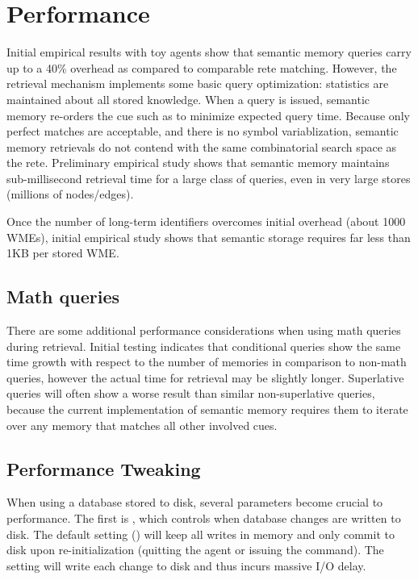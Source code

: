 \section{Performance}
\label{SMEM-perf}

Initial empirical results with toy agents show that semantic memory queries carry up to a 40\% overhead as compared to comparable rete matching.  
However, the retrieval mechanism implements some basic query optimization: statistics are maintained about all stored knowledge.  
When a query is issued, semantic memory re-orders the cue such as to minimize expected query time.  
Because only perfect matches are acceptable, and there is no symbol variablization, semantic memory retrievals do not contend with the same combinatorial search space as the rete.  
Preliminary empirical study shows that semantic memory maintains sub-millisecond retrieval time for a large class of queries, even in very large stores (millions of nodes/edges).

Once the number of long-term identifiers overcomes initial overhead (about 1000 WMEs), initial empirical study shows that semantic storage requires far less than 1KB per stored WME.

\subsection{Math queries}
There are some additional performance considerations when using math queries during retrieval.
Initial testing indicates that conditional queries show the same time growth with respect to the number of memories in comparison to non-math queries, however the actual time for retrieval may be slightly longer.
Superlative queries will often show a worse result than similar non-superlative queries, because the current implementation of semantic memory requires them to iterate over any memory that matches all other involved cues.

\subsection{Performance Tweaking}

When using a database stored to disk, several parameters become crucial to performance.  
The first is , which controls when database changes are written to disk.   
The default setting () will keep all writes in memory and only commit to disk upon re-initialization (quitting the agent or issuing the  command).  
The  setting will write each change to disk and thus incurs massive I/O delay.

